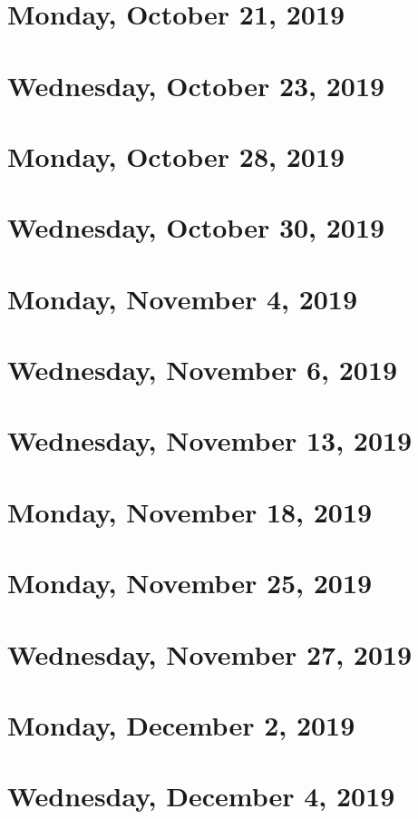 \documentclass{../mynotes}
\begin{document}
\section{Monday, October 21, 2019}
    
\section{Wednesday, October 23, 2019}
    

\section{Monday, October 28, 2019}
    
\section{Wednesday, October 30, 2019}
    
    
\section{Monday, November 4, 2019}
    
\section{Wednesday, November 6, 2019}
    
    
\section{Wednesday, November 13, 2019}
    
    
\section{Monday, November 18, 2019}
    

\section{Monday, November 25, 2019}
    
\section{Wednesday, November 27, 2019}
    
    
\section{Monday, December 2, 2019}
    
\section{Wednesday, December 4, 2019}
    
\end{document}
